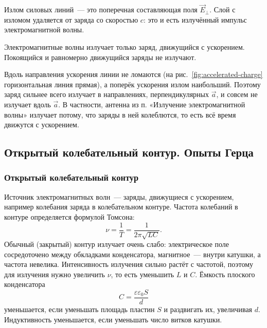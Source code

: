 \documentclass[12pt]{article}
\begin{document}
	Излом силовых линий~--- это поперечная составляющая поля $\vec{E}_\perp$. Слой с изломом удаляется от заряда со скоростью $c$: это и есть излучённый импульс электромагнитной волны.

	\begin{statement}
		Электромагнитные волны излучает только заряд, движущийся с ускорением. Покоящийся и равномерно движущийся заряды не излучают.
	\end{statement}

	\begin{note}
		Вдоль направления ускорения линии не ломаются (на рис.~\ref{fig:accelerated-charge} горизонтальная линия прямая), а поперёк ускорения излом наибольший. Поэтому заряд сильнее всего излучает в направлениях, перпендикулярных $\vec{a}$, и совсем не излучает вдоль $\vec{a}$. В частности, антенна из п. «Излучение электромагнитной волны» излучает потому, что заряды в ней колеблются, то есть всё время движутся с ускорением.
	\end{note}

	\subsection{Открытый колебательный контур. Опыты Герца}

	\subsubsection{Открытый колебательный контур}

	Источник электромагнитных волн~--- заряды, движущиеся с ускорением, например колебания заряда в колебательном контуре. Частота колебаний в контуре определяется формулой Томсона:
	\[
		\nu = \dfrac{1}{T} = \dfrac{1}{2\pi \sqrt{LC}}.
	\]
	Обычный (закрытый) контур излучает очень слабо: электрическое поле сосредоточено между обкладками конденсатора, магнитное~--- внутри катушки, а частота невелика. Интенсивность излучения сильно растёт с частотой, поэтому для излучения нужно увеличить $\nu$, то есть уменьшить $L$ и $C$. Ёмкость плоского конденсатора
	\[
		C = \dfrac{\varepsilon \varepsilon_0 S}{d}
	\]
	уменьшается, если уменьшать площадь пластин $S$ и раздвигать их, увеличивая $d$. Индуктивность уменьшается, если уменьшать число витков катушки.
\end{document}
